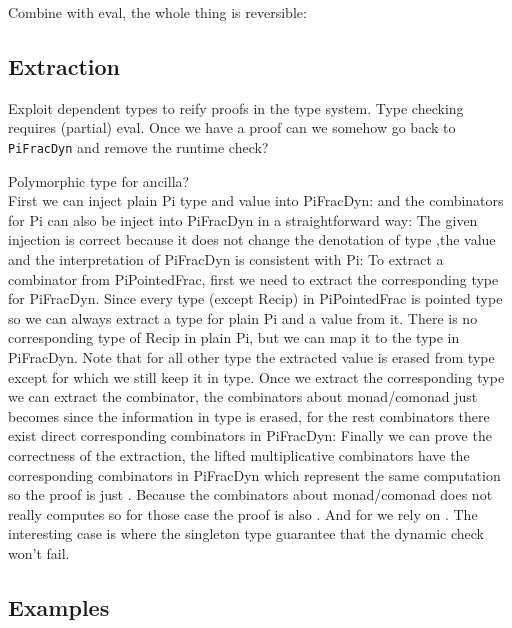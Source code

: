 \documentclass[sigplan,10pt,review,anonymous]{acmart}
\begin{document}
Combine with eval, the whole thing is reversible:
\PIPFrev{}

\subsection{Extraction}

Exploit dependent types to reify proofs in the type system. Type
checking requires (partial) eval. Once we have a proof can we somehow
go back to \verb|PiFracDyn| and remove the runtime check?

Polymorphic type for ancilla?
\\
First we can inject plain Pi type and value into PiFracDyn:
\INJU{}
and the combinators for Pi can also be inject into PiFracDyn in a straightforward way:
\INJcomb{}
The given injection is correct because it does not change the denotation of type
\INJUeq{}
,the value
\INJVeq{}
and the interpretation of PiFracDyn is consistent with Pi:
\INJEvaleq{}
To extract a combinator from PiPointedFrac, first we need to extract the corresponding type for PiFracDyn.
Since every type (except Recip) in PiPointedFrac is pointed type so we can always extract a type for plain
Pi and a value from it.
There is no corresponding type of Recip in plain Pi, but we can map it to the
\AgdaSpace{} type in PiFracDyn.
Note that for all other type the extracted value is erased from type except for
\AgdaSpace{}
which we still keep it in type.
\EXTU{}
Once we extract the corresponding type we can extract the combinator, the combinators about monad/comonad
just becomes  since the information in type is erased,
for the rest combinators there exist direct corresponding combinators in PiFracDyn:
\EXTUComb{}
Finally we can prove the correctness of the extraction,
the lifted multiplicative combinators have the corresponding combinators in PiFracDyn which represent
the same computation so the proof is just .
Because the combinators about monad/comonad does not really
computes so for those case the proof is also .
And for  we rely on .
The interesting case is  where the singleton type guarantee that
the dynamic check won't fail.
\EXTeq{}

\subsection{Examples}
\label{sec:cat}  
\end{document}
